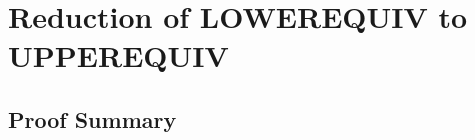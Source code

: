 \documentclass{article}
\begin{document}

\section{Reduction of LOWEREQUIV to UPPEREQUIV}

\subsection{Proof Summary}


\end{document}
